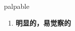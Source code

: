 
\begin{frame}
{\huge palpable}
\begin{center}
\begin{enumerate}\Large
  \item \textbf{明显的，易觉察的}
\end{enumerate}
\end{center}
\end{frame}
